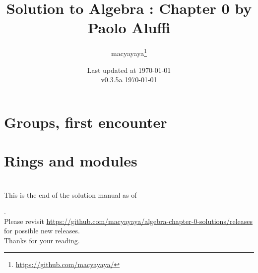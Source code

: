 \documentclass[12pt,a4paper,dvipsnames,oneside]{book}
\title{Solution to Algebra : Chapter 0 by Paolo Aluffi}
\author{macyayaya\thanks{\href{https://github.com/macyayaya/}{https://github.com/macyayaya/}}}
\date{Last updated at \today \\
v0.3.5a
}
\theoremstyle{definition}
\begin{document}
\setcounter{chapter}{1}
\frontmatter
\maketitle

\tableofcontents
\mainmatter
\chapter{Groups, first encounter}

\newpage
\chapter{Rings and modules}

\newpage

\backmatter
\chapter{}
\thispagestyle{empty}
\begin{center}
\large{
This is the end of the solution manual as of \date{\today}. \\
Please revisit \href{https://github.com/macyayaya/algebra-chapter-0-solutions/releases}{https://github.com/macyayaya/algebra-chapter-0-solutions/releases} \\
for possible new releases. \\
Thanks for your reading.
}
\end{center}
\end{document}
